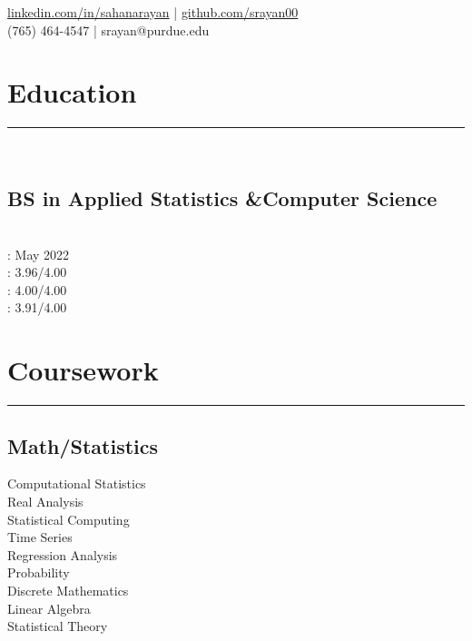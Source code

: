 \documentclass[]{sahana}
\begin{document}
{\href{https://www.linkedin.com/in/sahanarayan}{linkedin.com/in/sahanarayan} |
 \href{https://github.com/srayan00}{github.com/srayan00}\\
(765) 464-4547 | srayan@purdue.edu \\
}
%
%
\begin{minipage}[t]{0.33\textwidth}
\vspace{-3pt}
\section{Education} 
\noindent\rule{5cm}{0.4pt}\\
\vspace{-8pt}
\subsection{BS in Applied Statistics \&\newline Computer Science}
\\
 : May 2022\\
 : 3.96/4.00\\
 : 4.00/4.00\\
 : 3.91/4.00
\vspace{-5pt}
\sectionsep

\section{Coursework}
\noindent\rule{5cm}{0.4pt}
\subsection{Math/Statistics}
Computational Statistics\\
Real Analysis\\
Statistical Computing\\
Time Series\\
Regression Analysis\\
Probability\\
Discrete Mathematics\\
Linear Algebra\\
Statistical Theory
\vspace{6pt}

\end{minipage}
\end{document}

